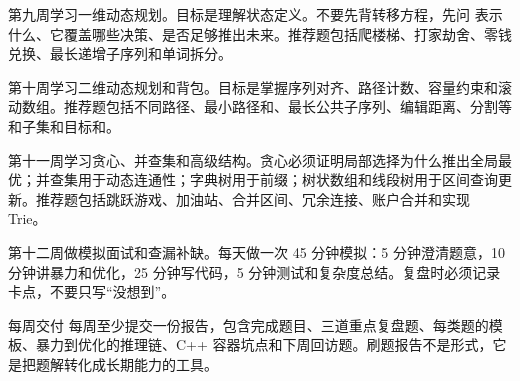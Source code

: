 第九周学习一维动态规划。目标是理解状态定义。不要先背转移方程，先问  表示什么、它覆盖哪些决策、是否足够推出未来。推荐题包括爬楼梯、打家劫舍、零钱兑换、最长递增子序列和单词拆分。

第十周学习二维动态规划和背包。目标是掌握序列对齐、路径计数、容量约束和滚动数组。推荐题包括不同路径、最小路径和、最长公共子序列、编辑距离、分割等和子集和目标和。

第十一周学习贪心、并查集和高级结构。贪心必须证明局部选择为什么推出全局最优；并查集用于动态连通性；字典树用于前缀；树状数组和线段树用于区间查询更新。推荐题包括跳跃游戏、加油站、合并区间、冗余连接、账户合并和实现 Trie。

第十二周做模拟面试和查漏补缺。每天做一次 45 分钟模拟：5 分钟澄清题意，10 分钟讲暴力和优化，25 分钟写代码，5 分钟测试和复杂度总结。复盘时必须记录卡点，不要只写“没想到”。

\begin{principlebox}{每周交付}
每周至少提交一份报告，包含完成题目、三道重点复盘题、每类题的模板、暴力到优化的推理链、C++ 容器坑点和下周回访题。刷题报告不是形式，它是把题解转化成长期能力的工具。
\end{principlebox}
